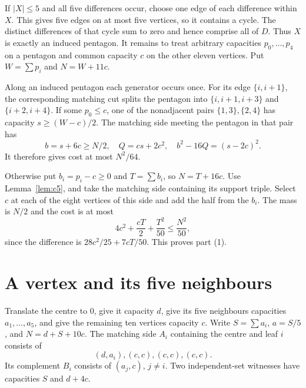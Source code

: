 \documentclass[11pt]{article}
\begin{document}
If $|X|\leq5$ and all five differences occur, choose one edge of each
difference within $X$. This gives five edges on at most five vertices,
so it contains a cycle. The distinct differences of that cycle sum to
zero and hence comprise all of $D$. Thus $X$ is exactly an induced
pentagon. It remains to treat arbitrary capacities $p_0,\ldots,p_4$ on
a pentagon and common capacity $c$ on the other eleven vertices.
Put $W=\sum p_i$ and $N=W+11c$.

Along an induced pentagon each generator occurs once.
For its edge $\{i,i+1\}$, the corresponding matching cut splits the
pentagon into $\{i,i+1,i+3\}$ and $\{i+2,i+4\}$.
If some $p_0\leq c$, one of the nonadjacent pairs
$\{1,3\},\{2,4\}$ has capacity $s\geq(W-c)/2$.
The matching side meeting the pentagon in that pair has
\[
 b=s+6c\geq N/2,\quad Q=cs+2c^2,\quad
 b^2-16Q=(s-2c)^2 .
\]
It therefore gives cost at most $N^2/64$.

Otherwise put $b_i=p_i-c\geq0$ and $T=\sum b_i$, so $N=T+16c$.
Use Lemma~\ref{lem:c5}, and take the matching side containing its
support triple. Select $c$ at each of the eight vertices of this side
and add the half from the $b_i$. The mass is $N/2$ and the cost is at most
\[
 4c^2+\frac{cT}{2}+\frac{T^2}{50}\leq\frac{N^2}{50},
\]
since the difference is $28c^2/25+7cT/50$.
This proves part (1).

\section{A vertex and its five neighbours}
Translate the centre to $0$, give it capacity $d$, give its five neighbours
capacities $a_1,\ldots,a_5$, and give the remaining ten vertices capacity $c$.
Write $S=\sum a_i$, $a=S/5$, and $N=d+S+10c$.
The matching side $A_i$ containing the centre and leaf $i$ consists of
\[
 (d,a_i),(c,c),(c,c),(c,c).
\]
Its complement $B_i$ consists of $(a_j,c)$, $j\ne i$.
Two independent-set witnesses have capacities $S$ and $d+4c$.
\end{document}
